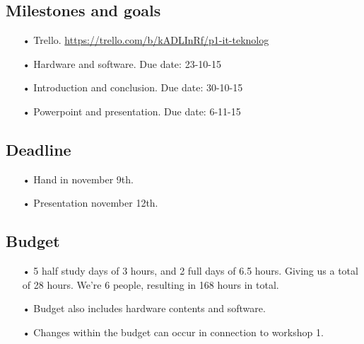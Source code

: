 \subsection{Milestones and goals}
\begin{enumerate}
\item[•]Trello. \url{https://trello.com/b/kADLInRf/p1-it-teknolog}
\item[•]Hardware and software. Due date: 23-10-15
\item[•]Introduction and conclusion. Due date: 30-10-15
\item[•]Powerpoint and presentation. Due date: 6-11-15
\end{enumerate}

\subsection{Deadline}
\begin{enumerate}
	\item[•]Hand in november 9th.
	\item[•]Presentation november 12th.
\end{enumerate}

\subsection{Budget}
\begin{enumerate}
	\item[•]5 half study days of 3 hours, and 2 full days of 6.5 hours. Giving us a total of 28 hours. We’re 6 people, resulting in 168 hours in total. 
	\item[•]Budget also includes hardware contents and software.
	\item[•]Changes within the budget can occur in connection to workshop 1.
\end{enumerate}